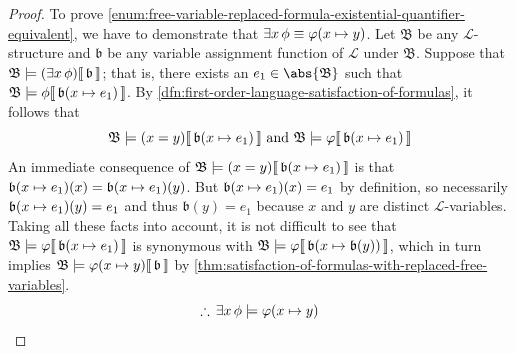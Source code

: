 \begin{proof}
    \vspace{0.3cm}
    \noindent
    To prove \ref{enum:free-variable-replaced-formula-existential-quantifier-equivalent}, we have to demonstrate that
    \( \exists x \, \phi \equiv \folfreevariablereplacement{\varphi}{x}{y} \).
    Let \( \mathfrak{B} \) be any \( \mathcal{L} \)-structure and \( \mathfrak{b} \) be any variable assignment function of \( \mathcal{L} \) under \( \mathfrak{B} \).
    Suppose that \( \folwffsatisfaction{\mathfrak{B}}{ \mleft( \exists x \, \phi \mright) }{\mathfrak{b}} \); that is, there exists an \( e_{1} \in \abs{\mathfrak{B}} \)
    such that \( \folwffsatisfaction{\mathfrak{B}}{\phi}{ \folmodifiedvariableassignmentfunction{\mathfrak{b}}{x}{e_{1}} } \).
    By \cref{dfn:first-order-language-satisfaction-of-formulas}, it follows that
    \begin{equation*}
        \folwffsatisfaction{\mathfrak{B}}{ \mleft( x = y \mright) }{ \folmodifiedvariableassignmentfunction{\mathfrak{b}}{x}{e_{1}} }
        \ \text{and}
        \ \folwffsatisfaction{\mathfrak{B}}{ \varphi }{ \folmodifiedvariableassignmentfunction{\mathfrak{b}}{x}{e_{1}} }
    \end{equation*}
    An immediate consequence of \( \folwffsatisfaction{\mathfrak{B}}{ \mleft( x = y \mright) }{ \folmodifiedvariableassignmentfunction{\mathfrak{b}}{x}{e_{1}} } \) is that
    \(  \folmodifiedvariableassignmentfunction{\mathfrak{b}}{x}{e_{1}}(x) = \folmodifiedvariableassignmentfunction{\mathfrak{b}}{x}{e_{1}}(y) \).
    But \( \folmodifiedvariableassignmentfunction{\mathfrak{b}}{x}{e_{1}}(x) = e_{1} \) by definition, so necessarily
    \( \folmodifiedvariableassignmentfunction{\mathfrak{b}}{x}{e_{1}}(y) = e_{1} \) and thus
    \( \mathfrak{b}(y) = e_{1} \) because \( x \) and \( y \) are distinct \( \mathcal{L} \)-variables.
    Taking all these facts into account, it is not difficult to see that
    \( \folwffsatisfaction{\mathfrak{B}}{ \varphi }{ \folmodifiedvariableassignmentfunction{\mathfrak{b}}{x}{e_{1}} } \) is synonymous with
    \( \folwffsatisfaction{\mathfrak{B}}{ \varphi }{ \folmodifiedvariableassignmentfunction{\mathfrak{b}}{x}{\mathfrak{b}(y)} } \), which in turn
    implies  \( \folwffsatisfaction{\mathfrak{B}}{ \folfreevariablereplacement{\varphi}{x}{y} }{\mathfrak{b}} \)
    by \cref{thm:satisfaction-of-formulas-with-replaced-free-variables}.
    \begin{equation*}
        \therefore \, \exists x \, \phi \models \folfreevariablereplacement{\varphi}{x}{y}
    \end{equation*}


\end{proof}
